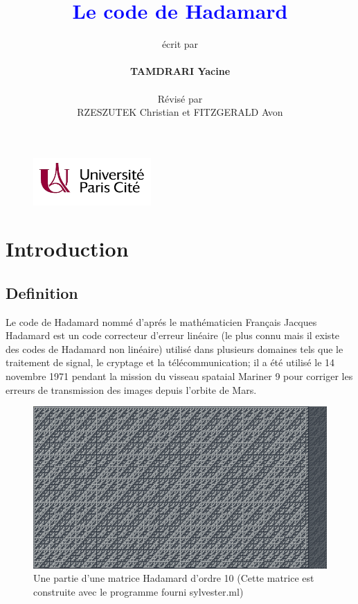 \documentclass{article}
\author{écrit par \\ \\ \textbf{TAMDRARI Yacine} \\ \\ Révisé par \\ RZESZUTEK Christian 
et FITZGERALD Avon}
\title{\Huge{\textbf{\textcolor{blue}{Le code de Hadamard}}}}
\begin{document}
\maketitle
\begin{figure}
\begin{center}
\includegraphics[width=0.4\textwidth]{logo.png}
\label{logo paris cité}
\end{center}
\end{figure}
\newpage
\titlepage

\tableofcontents
\newpage

\section{Introduction}

\subsection{Definition}

Le code de Hadamard nommé d'aprés le mathématicien Français Jacques
Hada\-mard est un code correcteur d'erreur linéaire (le plus connu mais il 
existe des codes de Hadamard non linéaire) utilisé dans plusieurs 
domaines tels que le traitement de signal, le cryptage et la 
télécommunication; il a été utilisé le 14 novembre 1971 pendant la mission
du visseau spataial Mariner 9 pour corriger les erreurs de transmission des
images depuis l'orbite de Mars.

\begin{figure}[h]
\begin{center}
\includegraphics[width=1\textwidth]{hadamard.png}
  \caption{Une partie d'une matrice Hadamard d'ordre 10 (Cette matrice est construite avec le programme fourni sylvester.ml)}
  \label{hadamard d'ordre 10}
\end{center}
\end{figure}
\end{document}
